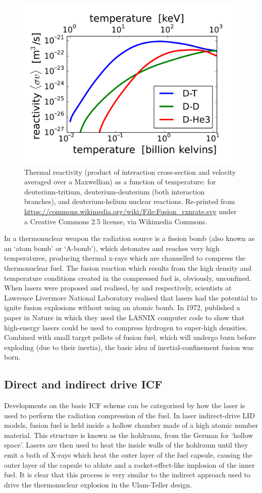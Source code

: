 \begin{figure}
 \centering
 \includegraphics[width=0.7\columnwidth]{Chapters/C1_Introduction/crossSection.png}
 \caption{Thermal reactivity (product of interaction cross-section and velocity averaged over a Maxwellian) as a function of temperature: for deuterium-tritium, deuterium-deuterium (both interaction branches), and deuterium-helium nuclear reactions. Re-printed from \url{https://commons.wikimedia.org/wiki/File:Fusion_rxnrate.svg} under a Creative Commons 2.5 license, via Wikimedia Commons.} \label{fig:crossSection}
\end{figure}

In a thermonuclear weapon the radiation source is a fission bomb (also known as an `atom bomb' or `A-bomb'), which detonates and reaches very high temperatures, producing thermal x-rays which are channelled to compress the thermonuclear fuel. The fusion reaction which results from the high density and temperature conditions created in the compressed fuel is, obviously, unconfined. When lasers were proposed and realised, by \citet{Maser1958} and \citet{Maiman1960} respectively, scientists at Lawrence Livermore National Laboratory realised that lasers had the potential to ignite fusion explosions without using an atomic bomb. In 1972, \citet{Nuckolls1972} published a paper in Nature in which they used the LASNIX computer code to show that high-energy lasers could be used to compress hydrogen to super-high densities. Combined with small target pellets of fusion fuel, which will undergo burn before exploding (due to their inertia), the basic idea of inertial-confinement fusion was born.

\subsection{Direct and indirect drive ICF}
Developments on the basic ICF scheme can be categorised by how the laser is used to perform the radiation compression of the fuel. In laser indirect-drive \acrshort{LID} models, fusion fuel is held inside a hollow chamber made of a high atomic number material. This structure is known as the hohlraum, from the German for `hollow space'. Lasers are then used to heat the inside walls of the hohlraum until they emit a bath of X-rays which heat the outer layer of the fuel capsule, causing the outer layer of the capsule to ablate and a rocket-effect-like implosion of the inner fuel. It is clear that this process is very similar to the indirect approach used to drive the thermonuclear explosion in the Ulam-Teller design.

